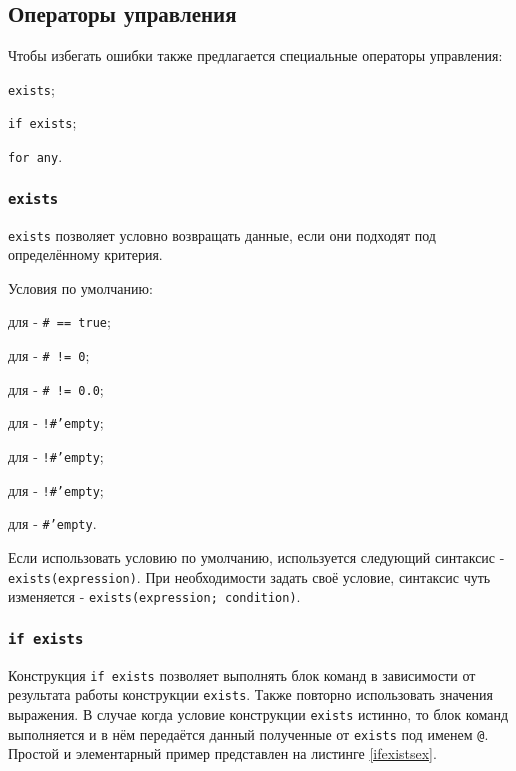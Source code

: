 \subsection{Операторы управления}

Чтобы избегать ошибки также предлагается специальные операторы управления:
\begin{icItems}
	\item \texttt{exists};
	\item \texttt{if exists};
	\item \texttt{for any}.
\end{icItems}

\subsubsection{\texttt{exists}}

\texttt{exists} позволяет условно возвращать данные, если они подходят под определённому критерия.

Условия по умолчанию:
\begin{icItems}
	\item
	для \bool{} - \texttt{# == true};
	\item
	для \integer{} - \texttt{# != 0};
	\item
	для \double{} - \texttt{# != 0.0};
	\item
	для \str{} - \texttt{!#'empty};
	\item
	для \listtype{} - \texttt{!#'empty};
	\item
	для \set{} - \texttt{!#'empty};
	\item
	для \element{} - \texttt{#'empty}.
\end{icItems}

Если использовать условию по умолчанию, используется следующий синтаксис - \texttt{exists(expression)}.
При необходимости задать своё условие, синтаксис чуть изменяется - \texttt{exists(expression; condition)}.

\subsubsection{\texttt{if exists}}

Конструкция \texttt{if exists} позволяет выполнять блок команд в зависимости от результата работы конструкции \texttt{exists}. Также повторно использовать значения выражения. В случае когда условие конструкции \texttt{exists} истинно, то блок команд выполняется и в нём передаётся данный полученные от \texttt{exists} под именем \texttt{@}.
Простой и элементарный пример представлен на листинге \ref{ifexistsex}.

